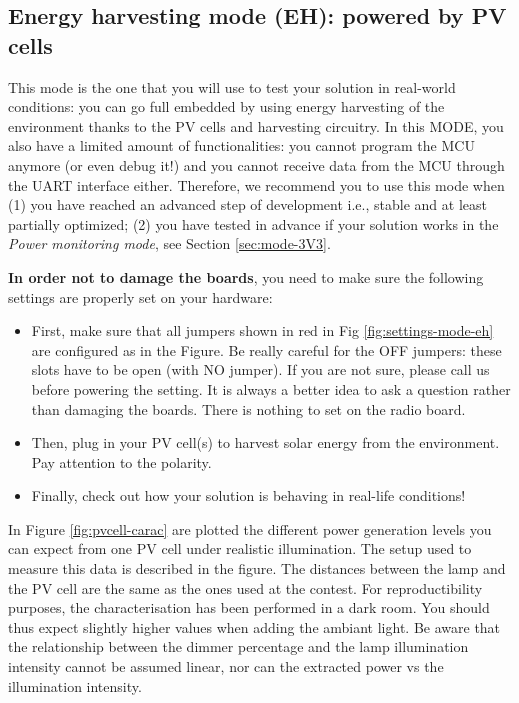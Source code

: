 \clearpage
\subsection{Energy harvesting mode (EH): powered by PV cells} \label{sec:mode-EH}

This mode is the one that you will use to test your solution in real-world conditions: you can go full embedded by using energy harvesting of the environment thanks to the PV cells and harvesting circuitry. In this MODE, you also have a limited amount of functionalities: you cannot program the MCU anymore (or even debug it!) and you cannot receive data from the MCU through the UART interface either. Therefore, we recommend you to use this mode when (1) you have reached an advanced step of development i.e., stable and at least partially optimized; (2) you have tested in advance if your solution works in the \textit{Power monitoring mode}, see Section \ref{sec:mode-3V3}.

\textbf{In order not to damage the boards}, you need to make sure the following settings are properly set on your hardware:

\begin{itemize}
    \item First, make sure that all jumpers shown in red in Fig \ref{fig:settings-mode-eh} are configured as in the Figure.
   Be really careful for the OFF jumpers: these slots have to be open (with NO jumper). If you are not sure, please call us before powering the setting. It is always a better idea to ask a question rather than damaging the boards. There is nothing to set on the radio board.
    \item Then, plug in your PV cell(s) to harvest solar energy from the environment. Pay attention to the polarity.
    \item Finally, check out how your solution is behaving in real-life conditions!
\end{itemize}

In Figure \ref{fig:pvcell-carac} are plotted the different power generation levels you can expect from one PV cell under realistic illumination. The setup used to measure this data is described in the figure. The distances between the lamp and the PV cell are the same as the ones used at the contest. For reproductibility purposes, the characterisation has been performed in a dark room. You should thus expect slightly higher values when adding the ambiant light. Be aware that the relationship between the dimmer percentage and the lamp illumination intensity cannot be assumed linear, nor can the extracted power vs the illumination intensity.


